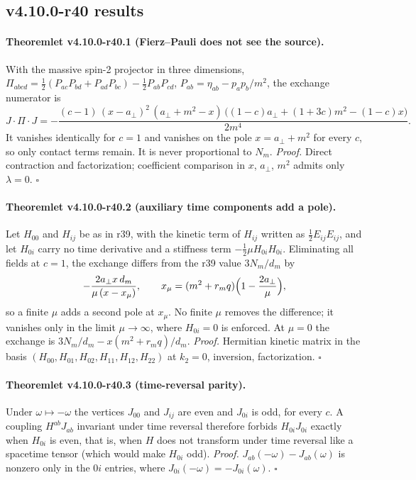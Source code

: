 \subsection*{v4.10.0-r40 results}
\label{subsec:v4100-r40-results}

\paragraph{Theoremlet v4.10.0-r40.1 (Fierz--Pauli does not see the source).}
With the massive spin-2 projector in three dimensions, \(\Pi_{abcd}=\tfrac12(P_{ac}P_{bd}+P_{ad}P_{bc})-\tfrac12P_{ab}P_{cd}\),
\(P_{ab}=\eta_{ab}-p_ap_b/m^2\), the exchange numerator is
\[
 J\cdot\Pi\cdot J=-\frac{(c-1)\,(x-a_\perp)^2\,(a_\perp+m^2-x)\,\bigl((1-c)a_\perp+(1+3c)m^2-(1-c)x\bigr)}{2m^4}.
\]
It vanishes identically for \(c=1\) and vanishes on the pole \(x=a_\perp+m^2\) for every \(c\), so only contact terms remain.  It is never
proportional to \(N_m\).
\emph{Proof.} Direct contraction and factorization; coefficient comparison in \(x\), \(a_\perp\), \(m^2\) admits only \(\lambda=0\).  \(\square\)

\paragraph{Theoremlet v4.10.0-r40.2 (auxiliary time components add a pole).}
Let \(H_{00}\) and \(H_{ij}\) be as in r39, with the kinetic term of \(H_{ij}\) written as \(\tfrac12E_{ij}E_{ij}\), and let \(H_{0i}\) carry no time derivative
and a stiffness term \(-\tfrac12\mu H_{0i}H_{0i}\).  Eliminating all fields at \(c=1\), the exchange differs from the r39 value \(3N_m/d_m\) by
\[
 -\frac{2a_\perp x\,d_m}{\mu\,(x-x_\mu)},\qquad x_\mu=(m^2+r_mq)\Bigl(1-\frac{2a_\perp}{\mu}\Bigr),
\]
so a finite \(\mu\) adds a second pole at \(x_\mu\).  No finite \(\mu\) removes the difference; it vanishes only in the limit \(\mu\to\infty\), where \(H_{0i}=0\)
is enforced.  At \(\mu=0\) the exchange is \(3N_m/d_m-x(m^2+r_mq)/d_m\).
\emph{Proof.} Hermitian kinetic matrix in the basis \((H_{00},H_{01},H_{02},H_{11},H_{12},H_{22})\) at \(k_2=0\), inversion, factorization.  \(\square\)

\paragraph{Theoremlet v4.10.0-r40.3 (time-reversal parity).}
Under \(\omega\mapsto-\omega\) the vertices \(J_{00}\) and \(J_{ij}\) are even and \(J_{0i}\) is odd, for every \(c\).  A coupling \(H^{ab}J_{ab}\) invariant under time
reversal therefore forbids \(H_{0i}J_{0i}\) exactly when \(H_{0i}\) is even, that is, when \(H\) does not transform under time reversal like a spacetime
tensor (which would make \(H_{0i}\) odd).
\emph{Proof.} \(J_{ab}(-\omega)-J_{ab}(\omega)\) is nonzero only in the \(0i\) entries, where \(J_{0i}(-\omega)=-J_{0i}(\omega)\).  \(\square\)

